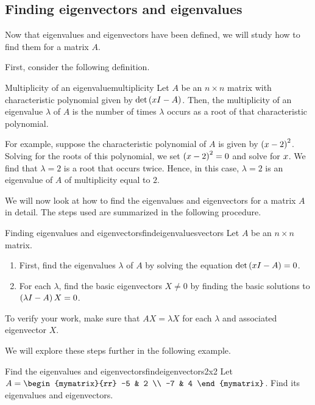 \subsection{Finding eigenvectors and eigenvalues}

Now that eigenvalues and eigenvectors have been defined, we will study how to find
 them for a matrix $A$. 

First, consider the following definition.

\begin{definition}{Multiplicity of an eigenvalue}{multiplicity}
Let $A$ be an $n \times n$ matrix with characteristic polynomial given by 
$\det \left(x I -  A\right)$. Then, the multiplicity of an eigenvalue $\lambda$ of $A$
is the number of times $\lambda$ occurs as a root of that characteristic polynomial.
\end{definition}

For example, suppose the characteristic polynomial of $A$ is given by
$\left(x - 2 \right)^2$. Solving for the roots of this
polynomial, we set $\left(x - 2 \right)^2 = 0$ and solve for
$x$.  We find that $\lambda = 2$ is a root that occurs
twice. Hence, in this case, $\lambda = 2$ is an eigenvalue of $A$ of
multiplicity equal to $2$.

We will now look at how to find the eigenvalues and eigenvectors for a
matrix $A$ in detail.  The steps used are summarized in the following
procedure.

\begin{procedure}{Finding eigenvalues and eigenvectors}{findeigenvaluesvectors}
%
Let $A$ be an $n \times n$ matrix. 
\begin{enumerate}
\item First, find the eigenvalues $\lambda$ of $A$ by solving the equation $\det \left(x I -A \right) = 0$. 

\item For each $\lambda$, find the basic eigenvectors $X \neq 0$ by finding the basic solutions to  $\left(\lambda I - A \right) X = 0$.
\end{enumerate}

To verify your work, make sure that $AX=\lambda X$
for each $\lambda$ and associated eigenvector $X$.
\end{procedure}

We will explore these steps further in the following example.

\begin{example}{Find the eigenvalues and eigenvectors}{findeigenvectors2x2}
Let $A = \begin{mymatrix}{rr}
-5 & 2 \\
-7 & 4 
\end{mymatrix}$. Find its eigenvalues and eigenvectors. 
\end{example}

